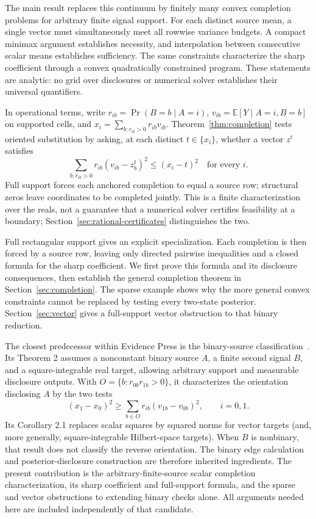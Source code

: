 \documentclass[11pt,a4paper]{article}
\newcommand{\E}{\mathbb E}
\begin{document}
The main result replaces this continuum by finitely many convex completion problems for arbitrary finite signal support. For each distinct source mean, a single vector must simultaneously meet all rowwise variance budgets. A compact minimax argument establishes necessity, and interpolation between consecutive scalar means establishes sufficiency. The same constraints characterize the sharp coefficient through a convex quadratically constrained program. These statements are analytic: no grid over disclosures or numerical solver establishes their universal quantifiers.

In operational terms, write $r_{ib}=\Pr(B=b\mid A=i)$, $v_{ib}=\E[Y\mid A=i,B=b]$ on supported cells, and $x_i=\sum_{b:r_{ib}>0}r_{ib}v_{ib}$. Theorem~\ref{thm:completion} tests oriented substitution by asking, at each distinct $t\in\{x_i\}$, whether a vector $z^t$ satisfies
\[
 \sum_{b:r_{ib}>0}r_{ib}(v_{ib}-z_b^t)^2\leq(x_i-t)^2
 \quad\text{for every }i.
\]
Full support forces each anchored completion to equal a source row; structural zeros leave coordinates to be completed jointly. This is a finite characterization over the reals, not a guarantee that a numerical solver certifies feasibility at a boundary; Section~\ref{sec:rational-certificates} distinguishes the two.

Full rectangular support gives an explicit specialization. Each completion is then forced by a source row, leaving only directed pairwise inequalities and a closed formula for the sharp coefficient. We first prove this formula and its disclosure consequences, then establish the general completion theorem in Section~\ref{sec:completion}. The sparse example shows why the more general convex constraints cannot be replaced by testing every two-state posterior. Section~\ref{sec:vector} gives a full-support vector obstruction to that binary reduction.

The closest predecessor within Evidence Press is the binary-source classification~\cite{EP}. Its Theorem 2 assumes a nonconstant binary source $A$, a finite second signal $B$, and a square-integrable real target, allowing arbitrary support and measurable disclosure outputs. With $O=\{b:r_{0b}r_{1b}>0\}$, it characterizes the orientation disclosing $A$ by the two tests
\[
 (x_1-x_0)^2\geq\sum_{b\in O}r_{ib}(v_{1b}-v_{0b})^2,
 \qquad i=0,1.
\]
Its Corollary 2.1 replaces scalar squares by squared norms for vector targets (and, more generally, square-integrable Hilbert-space targets). When $B$ is nonbinary, that result does not classify the reverse orientation. The binary edge calculation and posterior-disclosure construction are therefore inherited ingredients. The present contribution is the arbitrary-finite-source scalar completion characterization, its sharp coefficient and full-support formula, and the sparse and vector obstructions to extending binary checks alone. All arguments needed here are included independently of that candidate.
\end{document}
